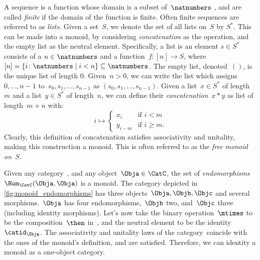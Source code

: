 \begin{example}[Sequences]
  A sequence is a function whose domain is a subset of~$\natnumbers$ , and are called \emph{finite} if the domain of the function is finite. Often finite sequences are referred to as \emph{lists}. Given a set~$S$, we denote the set of all lists on~$S$ by $S^\ast$. This can be made into a monoid, by considering \emph{concatenation} as the operation, and the empty list as the neutral element. Specifically, a list is an element $s\in S^\ast$ consists of a $n\in \natnumbers$ and a function~$f\colon [n]\to S$, where~$[n]=\{i\colon \natnumbers\mid i<n\}\subseteq \natnumbers$. The empty list, denoted~$()$, is the unique list of length 0. Given~$n>0$, we can write the list which assigns~$0,\ldots,n-1$ to~$s_0,s_1,\ldots,s_{n-1}$ as $(s_0,s_1,\ldots,s_{n-1})$. Given a list~$x\in S^\ast$ of length~$m$ and a list~$y\in S^\ast$ of length~$n$, we can define their \emph{concatenation}~$x*y$ as list of length~$m+n$ with:
  \begin{equation*}
    i\mapsto
    \begin{cases}
      x_i&\text{if }i<m\\
      y_{i-m}&\text{if }i\geq m.
    \end{cases}
  \end{equation*}
  Clearly, this definition of concatenation satisfies associativity and unitality, making this construction a monoid. This is often referred to as the \emph{free monoid on~$S$}.
\end{example}


\begin{example}
  Given any category~\CatC, and any object~$\Obja\in \CatC$, the set of \emph{endomorphisms}~$\Hom_{\CatC}(\Obja,\Obja)$ is a monoid. The category depicted in \cref{fig:monoid_endomorphisms} has three objects~$\Obja,\Objb,\Objc$ and several morphisms.~$\Obja$ has four endomorphisms,~$\Objb$ two, and~$\Objc$ three (including identity morphisms). Let's now take the binary operation~$\mtimes$ to be the composition~$\then$ in~\CatC, and the neutral element to be the identity~$\catid_\Obja$. The associativity and unitality laws of the category~\CatC coincide with the ones of the monoid's definition, and are satisfied. Therefore, we can identity a monoid as a one-object category.
\end{example}

